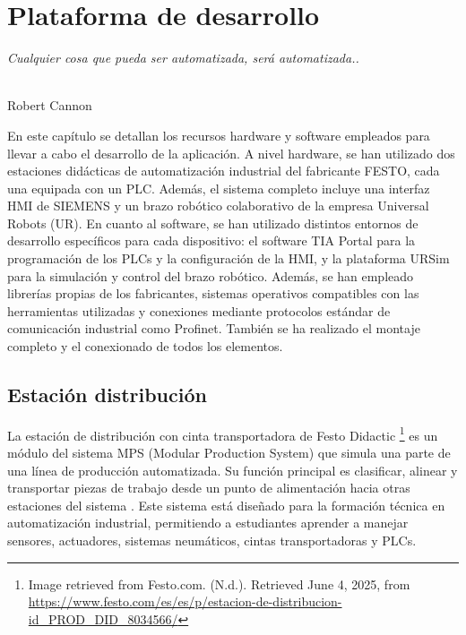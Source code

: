 \chapter{Plataforma de desarrollo}
\label{cap:capitulo3}

\begin{flushright}
\begin{minipage}[]{10cm}
\emph{Cualquier cosa que pueda ser automatizada, será automatizada..}\\
\end{minipage}\\

Robert Cannon\\
\end{flushright}

\vspace{1cm}

En este capítulo se detallan los recursos hardware y software empleados para llevar a cabo el desarrollo de la aplicación. A nivel hardware, se han utilizado dos estaciones didácticas de automatización industrial del fabricante FESTO, cada una equipada con un PLC. Además, el sistema completo incluye una interfaz HMI de SIEMENS y un brazo robótico colaborativo de la empresa Universal Robots (UR). En cuanto al software, se han utilizado distintos entornos de desarrollo específicos para cada dispositivo: el software TIA Portal para la programación de los PLCs y la configuración de la HMI, y la plataforma URSim para la simulación y control del brazo robótico. Además, se han empleado librerías propias de los fabricantes, sistemas operativos compatibles con las herramientas utilizadas y conexiones mediante protocolos estándar de comunicación industrial como Profinet. También se ha realizado el montaje completo y el conexionado de todos los elementos.

\section{Estación distribución}
\label{sec:estacion_distribucion}

La estación de distribución con cinta transportadora de Festo Didactic \footnote{Image retrieved from Festo.com. (N.d.). Retrieved June 4, 2025, from \url{https://www.festo.com/es/es/p/estacion-de-distribucion-id_PROD_DID_8034566/}} es un módulo del sistema MPS (Modular Production System) que simula una parte de una línea de producción automatizada. Su función principal es clasificar, alinear y transportar piezas de trabajo desde un punto de alimentación hacia otras estaciones del sistema \cite{estacion_distribucion}. Este sistema está diseñado para la formación técnica en automatización industrial, permitiendo a estudiantes aprender a manejar sensores, actuadores, sistemas neumáticos, cintas transportadoras y PLCs. \\

